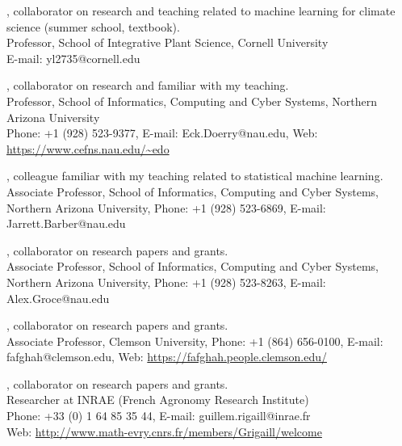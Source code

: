 \documentclass[margin,line]{res}
\begin{document}
\begin{resume}
, collaborator on research and teaching related to machine learning for climate science (summer school, textbook).\\
Professor, School of Integrative Plant Science, Cornell University\\
E-mail: yl2735@cornell.edu

, collaborator on research and familiar with my teaching.\\
Professor, School of Informatics, Computing and Cyber Systems, Northern Arizona University\\
Phone: +1 (928) 523-9377, E-mail: Eck.Doerry@nau.edu, Web: \url{https://www.cefns.nau.edu/~edo}

, colleague familiar with my teaching related to statistical machine learning.\\
Associate Professor, School of Informatics, Computing and Cyber Systems,\\
Northern Arizona University, 
Phone: +1 (928) 523-6869, E-mail: Jarrett.Barber@nau.edu

, collaborator on research papers and grants.\\
Associate Professor, School of Informatics, Computing and Cyber Systems,\\
Northern Arizona University, 
Phone: +1 (928) 523-8263, E-mail: Alex.Groce@nau.edu

, collaborator on research papers and grants.\\
Associate Professor, Clemson University, Phone: +1 (864) 656-0100, E-mail: fafghah@clemson.edu, Web: \url{https://fafghah.people.clemson.edu/}

, collaborator on research papers and grants.\\
Researcher at INRAE (French Agronomy Research Institute)\\
Phone: +33 (0) 1 64 85 35 44, E-mail: guillem.rigaill@inrae.fr\\
Web: \url{http://www.math-evry.cnrs.fr/members/Grigaill/welcome}

\end{resume}
\end{document}

